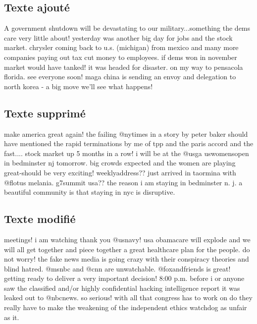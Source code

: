 \documentclass[10pt,twoside,fleqn,english,french]{article}
\begin{document}
		\subsection{Texte ajouté}
		
		A government shutdown will be devastating to our military...something the dems care very little about! yesterday was
		another big day for jobs and the stock market. chrysler coming back to u.s. (michigan) from mexico and many more companies
		paying out tax cut money to employees. if dems won in november market would have tanked! it was headed for disaster. on my
		way to pensacola florida.  see everyone soon! maga china is sending an envoy and delegation to north korea - a big move
		we'll see what happens!
		 
		\subsection{Texte supprimé}
		
		make america great again! the failing @nytimes in a story by peter baker should have mentioned the rapid terminations by
		me of tpp and the paris accord and the fast.... stock market up 5 months in a row! i will be at the @usga uswomensopen in
		bedminster nj tomorrow. big crowds expected and the women are playing great-should be very exciting! weeklyaddress?? just
		arrived in taormina with @flotus melania. g7summit usa?? the reason i am staying in bedminster n. j. a beautiful
		community is that staying in nyc is  disruptive.
		 
		\subsection{Texte modifié}
		
		meetings! i am watching  thank you @usnavy! usa obamacare will explode and we will all get together and piece together a
		great healthcare plan for the people. do not worry! the fake news media is going crazy with their conspiracy theories and
		blind hatred. @msnbc and @cnn are unwatchable. @foxandfriends is great! getting ready to deliver a very important decision!
		8:00 p.m. before i or anyone saw the classified and/or highly confidential hacking intelligence report it was leaked out to
		@nbcnews. so serious! with all that congress has to work on do they really have to make the weakening of the independent
		ethics watchdog as unfair as it.
		
\end{document}
